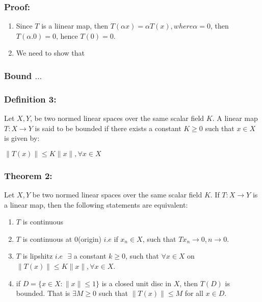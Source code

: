 \documentclass[12pt]{article}
\begin{document}
\subsubsection*{Proof:}
\begin{enumerate}
    \item Since $T$ is a liinear map, then $T(\alpha x) = \alpha T(x), where \alpha = 0$, then $T(\alpha.0) = 0$, hence $T(0) = 0$.
    \item We need to show that
\end{enumerate}

\subsubsection*{Bound $\dots$}
\subsubsection*{Definition 3:} Let $X,Y$, be two normed linear spaces over the same scalar field $K$. A linear map $T: X \to Y$ is said to be bounded if there exists a constant $K \geq 0$ such that $x \in X$ is given by: 

\begin{math}
    \|T(x)\| \leq K \|x\|, \forall x \in X
\end{math}

\subsubsection*{Theorem 2:} Let $X,Y$ be two normed linear spaces over the same scalar field $K$. If $T: X \to Y$ is a linear map, then the following statements are equivalent:

\begin{enumerate}
    \item $T$ is continuous
    \item $T$ is continuous at $0$(origin) $i.e$ if ${x_n} \in X$, such that $Tx_n \to 0, n \to 0 $.
    \item $T$ is lipshitz $i.e \text{ } \exists $ a constant $k \geq 0$, such that $\forall x \in X$ on $ \|T(x)\| \leq K \|x\|, \forall x \in X$.
    \item if $D = \{x \in X:  \|x\| \leq 1\}$ is a closed unit disc in $X$, then $T(D)$ is bounded. That is $\exists M \geq 0$ such that $\|T(x)\| \leq M$ for all $x \in D$.
\end{enumerate}
\end{document}

